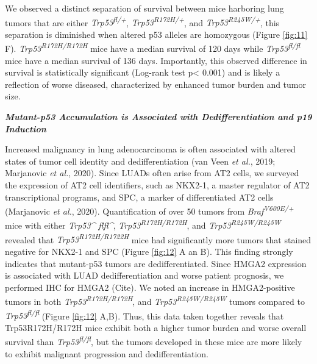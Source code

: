 We observed a distinct separation of survival between mice harboring lung tumors that are either \emph{Trp53\textsuperscript{fl/+}}, \emph{Trp53\textsuperscript{R172H/+}}, and \emph{Trp53\textsuperscript{R245W/+}}, this separation is diminished when altered p53 alleles are homozygous (Figure \ref{fig:11} F). \emph{Trp53\textsuperscript{R172H/R172H}} mice have a median survival of 120 days while \emph{Trp53\textsuperscript{fl/fl}} mice have a median survival of 136 days. Importantly, this observed difference in survival is statistically significant (Log-rank test p\textless{} 0.001) and is likely a reflection of worse diseased, characterized by enhanced tumor burden and tumor size.

\emph{\textbf{Mutant-p53 Accumulation is Associated with Dedifferentiation and p19 Induction}}

Increased malignancy in lung adenocarcinoma is often associated with altered states of tumor cell identity and dedifferentiation (van Veen \emph{et al.}, 2019; Marjanovic \emph{et al.}, 2020). Since LUADs often arise from AT2 cells, we surveyed the expression of AT2 cell identifiers, such as NKX2-1, a master regulator of AT2 transcriptional programs, and SPC, a marker of differentiated AT2 cells (Marjanovic \emph{et al.}, 2020). Quantification of over 50 tumors from \emph{Braf\textsuperscript{V600E/+}} mice with either \emph{Trp53\^{} flfl\^{}}, \emph{Trp53\textsuperscript{R172H/R172H}}, and \emph{Trp53\textsuperscript{R245W/R245W}} revealed that \emph{Trp53\textsuperscript{R172H/R1722H}} mice had significantly more tumors that stained negative for NKX2-1 and SPC (Figure \ref{fig:12} A an B). This finding strongly indicates that mutant-p53 tumors are dedifferentiated. Since HMGA2 expression is associated with LUAD dedifferentiation and worse patient prognosis, we performed IHC for HMGA2 (Cite). We noted an increase in HMGA2-positive tumors in both \emph{Trp53\textsuperscript{R172H/R172H}}, and \emph{Trp53\textsuperscript{R245W/R245W}} tumors compared to \emph{Trp53\textsuperscript{fl/fl}} (Figure \ref{fig:12} A,B). Thus, this data taken together reveals that Trp53R172H/R172H mice exhibit both a higher tumor burden and worse overall survival than \emph{Trp53\textsuperscript{fl/fl}}, but the tumors developed in these mice are more likely to exhibit malignant progression and dedifferentiation.

